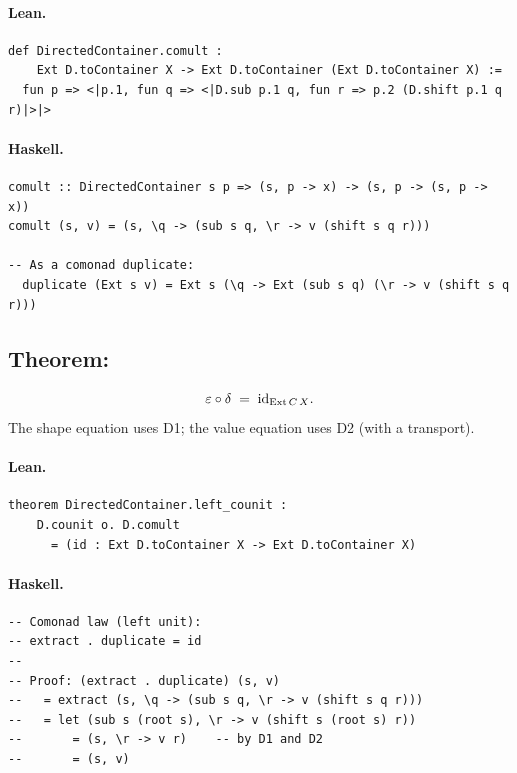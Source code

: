 \documentclass[11pt,a4paper]{article}
\begin{document}
\paragraph{Lean.}
\begin{lstlisting}[style=lean]
def DirectedContainer.comult :
    Ext D.toContainer X -> Ext D.toContainer (Ext D.toContainer X) :=
  fun p => <|p.1, fun q => <|D.sub p.1 q, fun r => p.2 (D.shift p.1 q r)|>|>
\end{lstlisting}

\paragraph{Haskell.}
\begin{lstlisting}[style=haskell]
comult :: DirectedContainer s p => (s, p -> x) -> (s, p -> (s, p -> x))
comult (s, v) = (s, \q -> (sub s q, \r -> v (shift s q r)))

-- As a comonad duplicate:
  duplicate (Ext s v) = Ext s (\q -> Ext (sub s q) (\r -> v (shift s q r)))
\end{lstlisting}


\subsection{Theorem: }

\begin{thm}
\[
  \varepsilon \circ \delta \;=\; \mathrm{id}_{\mathrm{Ext}\,C\,X}.
\]
The shape equation uses D1; the value equation uses D2 (with a transport).
\end{thm}

\paragraph{Lean.}
\begin{lstlisting}[style=lean]
theorem DirectedContainer.left_counit :
    D.counit o. D.comult
      = (id : Ext D.toContainer X -> Ext D.toContainer X)
\end{lstlisting}

\paragraph{Haskell.}
\begin{lstlisting}[style=haskell]
-- Comonad law (left unit):
-- extract . duplicate = id
--
-- Proof: (extract . duplicate) (s, v)
--   = extract (s, \q -> (sub s q, \r -> v (shift s q r)))
--   = let (sub s (root s), \r -> v (shift s (root s) r))
--       = (s, \r -> v r)    -- by D1 and D2
--       = (s, v)
\end{lstlisting}
\end{document}
